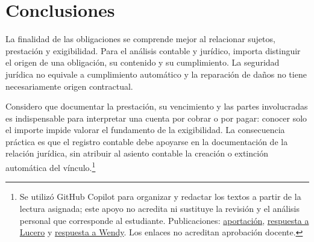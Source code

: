 {\clearpage
\section{Conclusiones}
La finalidad de las obligaciones se comprende mejor al relacionar sujetos, prestación y exigibilidad. Para el análisis contable y jurídico, importa distinguir el origen de una obligación, su contenido y su cumplimiento. La seguridad jurídica no equivale a cumplimiento automático y la reparación de daños no tiene necesariamente origen contractual.

Considero que documentar la prestación, su vencimiento y las partes involucradas es indispensable para interpretar una cuenta por cobrar o por pagar: conocer solo el importe impide valorar el fundamento de la exigibilidad. La consecuencia práctica es que el registro contable debe apoyarse en la documentación de la relación jurídica, sin atribuir al asiento contable la creación o extinción automática del vínculo.\footnote{Se utilizó GitHub Copilot para organizar y redactar los textos a partir de la lectura asignada; este apoyo no acredita ni sustituye la revisión y el análisis personal que corresponde al estudiante. Publicaciones: \href{https://virtual.uas.edu.mx/fca/mod/forum/discuss.php?d=3616\#p77949}{aportación}, \href{https://virtual.uas.edu.mx/fca/mod/forum/discuss.php?d=3616\#p77950}{respuesta a Lucero} y \href{https://virtual.uas.edu.mx/fca/mod/forum/discuss.php?d=3616\#p77951}{respuesta a Wendy}. Los enlaces no acreditan aprobación docente.}
}
